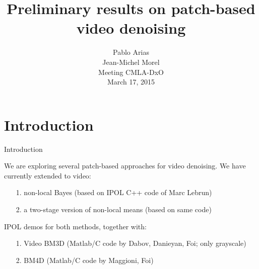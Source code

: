 \documentclass[mathserif]{beamer}
\title[Video denoising]{$\,$ \\ $\,$ \\ Preliminary results on patch-based video denoising}
\author[Pablo Arias]{Pablo Arias\\ Jean-Michel Morel\vspace{.5cm}\\ $\,$ \\ $\,$ \\ $\,$ \\
Meeting CMLA-DxO \\March 17, 2015}
\institute[CMLA]{}
\date[]{}
\begin{document}
\begin{frame}
    \titlepage
\end{frame}


\section{Introduction}


\begin{frame}{Introduction}

	We are exploring several patch-based approaches for video denoising.
	We have currently extended to video:

	\vspace{.2cm}

	\begin{enumerate}
		\item[1.] non-local Bayes (based on IPOL C++ code of Marc Lebrun)
		\item[2.] a two-stage version of non-local means (based on same code)
	\end{enumerate}

	\vspace{1cm}

	IPOL demos for both methods, together with:

	\vspace{.2cm}

	\begin{enumerate}
		\item[1.] Video BM3D (Matlab/C code by Dabov, Danieyan, Foi; only grayscale)
		\item[2.] BM4D (Matlab/C code by Maggioni, Foi)
	\end{enumerate}
	
\end{frame}
\end{document}
